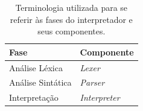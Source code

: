 \begin{table}[h]
	\centering
	\caption{Terminologia utilizada para se referir às fases do interpretador e seus componentes.}
	{
		\begin{tabular}{ll}
			\hline
			\textbf{Fase}     & \textbf{Componente}  \\ \hline
			Análise Léxica    & \textit{Lexer}       \\
			Análise Sintática & \textit{Parser}      \\
			Interpretação     & \textit{Interpreter} \\ \hline
		\end{tabular}
	}
	\label{tab:terminologia_fases}
\end{table}
